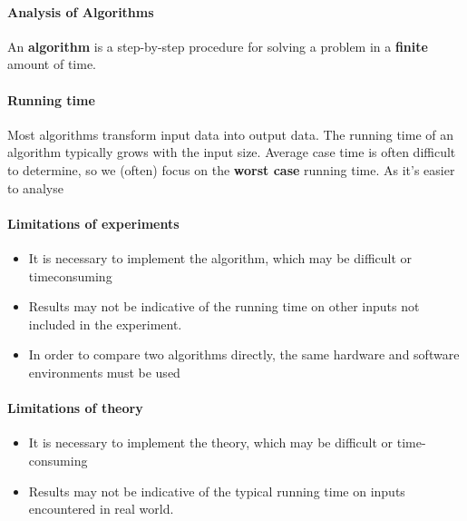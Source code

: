 \documentclass{article}
\begin{document}
\paragraph*{Analysis of Algorithms}
\begin{flushleft}
An \textbf{algorithm} is a step-by-step procedure for solving a problem in a \textbf{finite} amount of time.
\end{flushleft}

\paragraph{Running time}
\begin{flushleft}
Most algorithms transform input data into output data. The running time of an algorithm typically grows with the input size.
Average case time is often difficult to determine, so we (often) focus on the \textbf{worst case} running time. As it's easier to analyse
\end{flushleft}

\paragraph{Limitations of experiments}
\begin{flushleft}
	\begin{itemize}
		\item It is necessary to implement the algorithm, which may be difficult or timeconsuming
		\item Results may not be indicative of the running time on other inputs not included in the experiment.
		\item In order to compare two algorithms directly, the same hardware and software environments must be used
	\end{itemize}
\end{flushleft}

\paragraph{Limitations of theory}
\begin{flushleft}
	\begin{itemize}
		\item It is necessary to implement the theory, which may be difficult or time-consuming
		\item Results may not be indicative of the typical running time on inputs encountered in real world.
	\end{itemize}
\end{flushleft}
\end{document}

